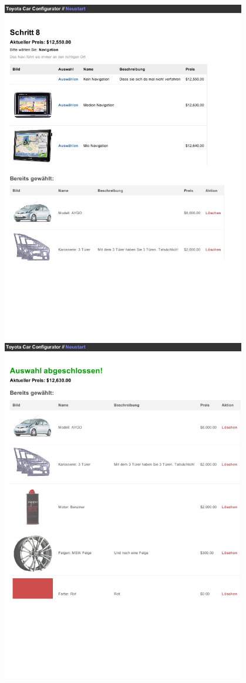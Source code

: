 \documentclass[a4paper,10pt]{article}
\begin{document}
\\
\includegraphics[width=0.8\textwidth]{screenshots/screenshot6.png}
\\
\includegraphics[width=0.8\textwidth]{screenshots/screenshot7.png}
\end{document}
